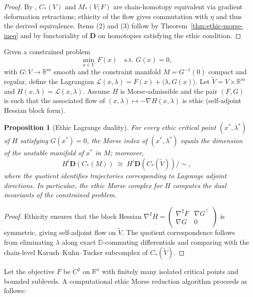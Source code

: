 \documentclass[12pt]{article}
\newcommand{\RR}{\mathbb{R}}
\newcommand{\DD}{\mathbb{D}}
\theoremstyle{plain}
\newtheorem{proposition}[theorem]{Proposition}
\theoremstyle{definition}
\theoremstyle{remark}
\numberwithin{equation}{section}
\begin{document}
\begin{proof}
By \cite{Milnor1963}, $C_\ast(V)$ and $M_\ast(V;F)$ are chain-homotopy equivalent via gradient deformation retractions; ethicity of the flow gives commutation with $\eta$ and thus the derived equivalence.  Items (2) and (3) follow by Theorem~\ref{thm:ethic-morse-ineq} and by functoriality of $\mathbf D$ on homotopies satisfying the ethic condition.
\end{proof}

Given a constrained problem
\[
\min_{x\in V}\, F(x)\quad\text{s.t. }G(x)=0,
\]
with $G:V\to \RR^m$ smooth and the constraint manifold $M=G^{-1}(0)$ compact and regular, define the Lagrangian
\(
\mathcal L(x,\lambda)=F(x)+\langle \lambda,G(x)\rangle.
\)
Let $\tilde V=V\times \RR^m$ and $H(x,\lambda)=\mathcal L(x,\lambda)$.  
Assume $H$ is Morse-admissible and the pair $(F,G)$ is such that the associated flow of $(x,\lambda)\mapsto-\nabla H(x,\lambda)$ is ethic (self-adjoint Hessian block form).  

\begin{proposition}[Ethic Lagrange duality]
For every ethic critical point $(x^\ast,\lambda^\ast)$ of $H$ satisfying $G(x^\ast)=0$,  
the Morse index of $(x^\ast,\lambda^\ast)$ equals the dimension of the unstable manifold of $x^\ast$ in $M$; moreover,
\[
H^i\mathbf D(C_\ast(M))\;\cong\;
H^i\mathbf D(C_\ast(\tilde V))\big/\!\!\sim,
\]
where the quotient identifies trajectories corresponding to Lagrange adjoint directions.  In particular, the ethic Morse complex for $H$ computes the dual invariants of the constrained problem.
\end{proposition}

\begin{proof}
Ethicity ensures that the block Hessian $\nabla^2 H=\begin{pmatrix}\nabla^2F & \nabla G^\top\\ \nabla G & 0\end{pmatrix}$ is symmetric, giving self-adjoint flow on $\tilde V$.  The quotient correspondence follows from eliminating $\lambda$ along exact $\DD$-commuting differentials and comparing with the chain-level Karush–Kuhn–Tucker subcomplex of $C_\ast(\tilde V)$.
\end{proof}

Let the objective $F$ be $C^2$ on $\RR^n$ with finitely many isolated critical points and bounded sublevels.
A computational ethic Morse reduction algorithm proceeds as follows:
\end{document}

